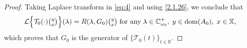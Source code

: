 \documentclass[10pt,a4paper]{amsart}
\newcommand\R{\mathbb R}
\newcommand\bX{{\mathbb X}}
\newcommand\cT{{\mathcal T}}
\newcommand{\dom}{\text{\rm{dom}}}
\begin{document}
\begin{proof}
	Taking Laplace transform in \eqref{eq:4} and using \eqref{2.1.26}, we conclude that
	\begin{equation}\label{2.1.27}
		\mathcal{L}\Bigl\{\cT_0(\cdot)\tbinom{y}{x}\Bigr\}(\lambda)=R(\lambda,G_0)\tbinom{y}{x}
		\;\mbox{for any}\;\lambda\in\mathbb{C}_{\omega_0}^+,\;y\in\dom(A_0),\;x\in\bX,
	\end{equation}
	which proves that $G_0$ is the generator of $\{\cT_0(t)\}_{t\in\R}$.
\end{proof}
\end{document}
